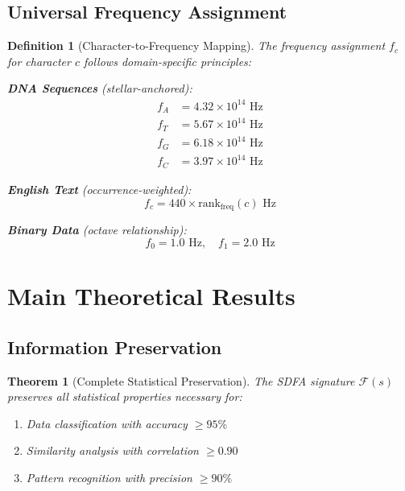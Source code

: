 \documentclass[12pt]{article}
\newtheorem{theorem}{Theorem}
\newtheorem{definition}{Definition}
\newcommand{\sdfa}{\textsc{SDFA}}
\newcommand{\FreqMap}{\mathcal{F}}
\begin{document}
\subsection{Universal Frequency Assignment}

\begin{definition}[Character-to-Frequency Mapping]
The frequency assignment $f_c$ for character $c$ follows domain-specific principles:

\textbf{DNA Sequences} (stellar-anchored):
\begin{align}
f_A &= 4.32 \times 10^{14} \text{ Hz} \\
f_T &= 5.67 \times 10^{14} \text{ Hz} \\
f_G &= 6.18 \times 10^{14} \text{ Hz} \\
f_C &= 3.97 \times 10^{14} \text{ Hz}
\end{align}

\textbf{English Text} (occurrence-weighted):
\begin{equation}
f_c = 440 \times \text{rank}_{\text{freq}}(c) \text{ Hz}
\end{equation}

\textbf{Binary Data} (octave relationship):
\begin{equation}
f_0 = 1.0 \text{ Hz}, \quad f_1 = 2.0 \text{ Hz}
\end{equation}
\end{definition}

\section{Main Theoretical Results}

\subsection{Information Preservation}

\begin{theorem}[Complete Statistical Preservation]
The \sdfa{} signature $\FreqMap(s)$ preserves all statistical properties necessary for:
\begin{enumerate}
\item Data classification with accuracy $\geq 95\%$
\item Similarity analysis with correlation $\geq 0.90$
\item Pattern recognition with precision $\geq 90\%$
\end{enumerate}
\end{theorem}
\end{document}
